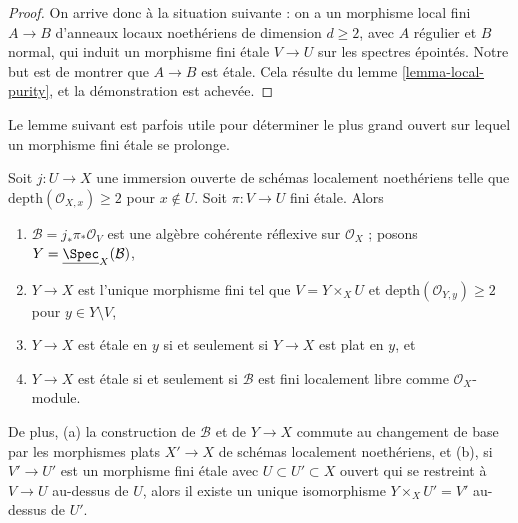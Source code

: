 \begin{proof}
\medskip\noindent
On arrive donc à la situation suivante : on a un morphisme
local fini $A \to B$ d'anneaux locaux noethériens
de dimension $d \geq 2$, avec $A$ régulier et $B$ normal, qui
induit un morphisme fini étale $V \to U$ sur les spectres épointés.
Notre but est de montrer que $A \to B$ est étale.
Cela résulte du lemme \ref{lemma-local-purity},
et la démonstration est achevée.
\end{proof}

\noindent
Le lemme suivant est parfois utile pour déterminer le plus grand
ouvert sur lequel un morphisme fini étale se prolonge.

\begin{lemma}
\label{lemma-extend-S2}
Soit $j : U \to X$ une immersion ouverte de schémas localement noethériens
telle que $\text{depth}(\mathcal{O}_{X, x}) \geq 2$ pour $x \not \in U$.
Soit $\pi : V \to U$ fini étale. Alors
\begin{enumerate}
\item $\mathcal{B} = j_*\pi_*\mathcal{O}_V$ est une algèbre cohérente
réflexive sur $\mathcal{O}_X$ ; posons $Y = \underline{\Spec}_X(\mathcal{B})$,
\item $Y \to X$ est l'unique morphisme fini tel que
$V = Y \times_X U$ et $\text{depth}(\mathcal{O}_{Y, y}) \geq 2$
pour $y \in Y \setminus V$,
\item $Y \to X$ est étale en $y$ si et seulement si $Y \to X$ est plat en $y$, et
\item $Y \to X$ est étale si et seulement si $\mathcal{B}$
est fini localement libre comme $\mathcal{O}_X$-module.
\end{enumerate}
De plus, (a) la construction de $\mathcal{B}$ et de $Y \to X$ commute
au changement de base par les morphismes plats $X' \to X$ de schémas
localement noethériens, et (b), si $V' \to U'$ est un morphisme fini étale avec
$U \subset U' \subset X$ ouvert qui se restreint à $V \to U$ au-dessus de $U$,
alors il existe un unique isomorphisme $Y \times_X U' = V'$ au-dessus de $U'$.
\end{lemma}

